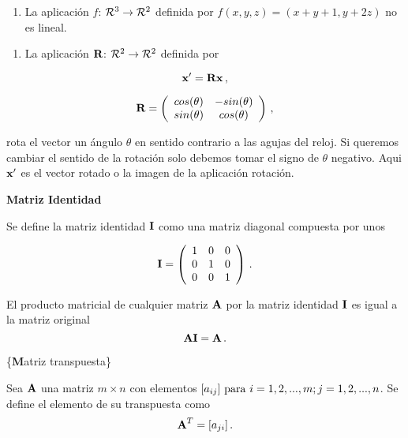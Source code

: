 \documentclass[
]{agujournal2019}
\providecommand{\tightlist}{%
  \setlength{\itemsep}{0pt}\setlength{\parskip}{0pt}}\usepackage{longtable,booktabs,array}
\begin{document}
\vspace{0.5cm}

\begin{enumerate}
\def\labelenumi{(\arabic{enumi})}
\setcounter{enumi}{1}
\tightlist
\item
  La aplicación \(f\): \({\cal R}^3 \rightarrow {\cal R}^2\) definida
  por \(f(x,y,z)=(x+y+1,y+2z)\) no es lineal.
\end{enumerate}

\vspace{0.5cm}

\begin{enumerate}
\def\labelenumi{(\arabic{enumi})}
\setcounter{enumi}{2}
\tightlist
\item
  La aplicación \({\textbf R}\): \({\cal R}^2 \rightarrow {\cal R}^2\)
  definida por
\end{enumerate}

\[{\textbf x}'={\textbf R}{\textbf x}\,,\]

\[{\textbf R}=\left( \begin{array}{cc}
     cos(\theta) & -sin(\theta)\\
     sin(\theta) & cos(\theta)
       \end{array} \right)\,,\]

rota el vector un ángulo \(\theta\) en sentido contrario a las agujas
del reloj. Si queremos cambiar el sentido de la rotación solo debemos
tomar el signo de \(\theta\) negativo. Aqui \({\textbf x}'\) es el
vector rotado o la imagen de la aplicación rotación.

\vspace{0.5cm}

\textbf{Matriz Identidad}

Se define la matriz identidad \({\textbf I}\) como una matriz diagonal
compuesta por unos

\[{\textbf I}=\left(\begin{array}{ccc}
  1 & 0 & 0\\
  0 & 1 & 0\\
  0 & 0 & 1
\end{array}\right)\,.\]

El producto matricial de cualquier matriz \({\textbf A}\) por la matriz
identidad \({\textbf I}\) es igual a la matriz original
\[{\textbf A}{\textbf I}={\textbf A}\,.\]

\vspace{0.5cm}

\{\noindent \textbf Matriz transpuesta\}

Sea \({\textbf A}\) una matriz \(m\times n\) con elementos
\([a_{ij}]\,\,{\rm para}\,\,i=1,2,...,m; j=1,2,...,n\). Se define el
elemento de su transpuesta como \[{\textbf A}^T=[a_{ji}]\,.\]
\end{document}
